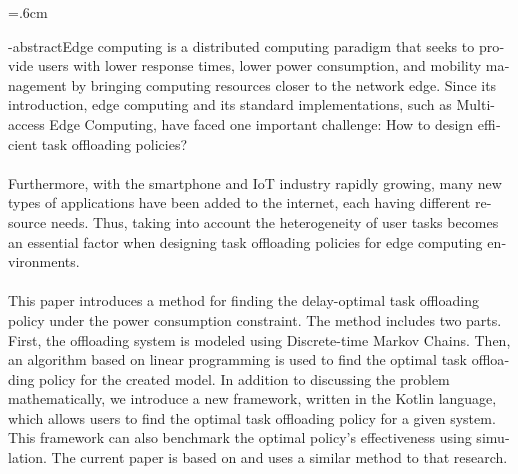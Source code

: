 
\baselineskip=.6cm
\begin{latin}
\en-abstract{Edge computing is a distributed computing paradigm that seeks to provide users with lower response times, lower power consumption, and mobility management by bringing computing resources closer to the network edge. Since its introduction, edge computing and its standard implementations, such as Multi-access Edge Computing, have faced one important challenge: How to design efficient task offloading policies? \\ \\ Furthermore, with the smartphone and IoT industry rapidly growing, many new types of applications have been added to the internet, each having different resource needs. Thus, taking into account the heterogeneity of user tasks becomes an essential factor when designing task offloading policies for edge computing environments.\\ \\This paper introduces a method for finding the delay-optimal task offloading policy under the power consumption constraint. The method includes two parts. First, the offloading system is modeled using Discrete-time Markov Chains. Then, an algorithm based on linear programming is used to find the optimal task offloading policy for the created model. In addition to discussing the problem mathematically, we introduce a new framework, written in the Kotlin language, which allows users to find the optimal task offloading policy for a given system. This framework can also benchmark the optimal policy's effectiveness using simulation. The current paper is based on \cite{Liu} and uses a similar method to that research.  
}
\latinfirstPage
\end{latin}
